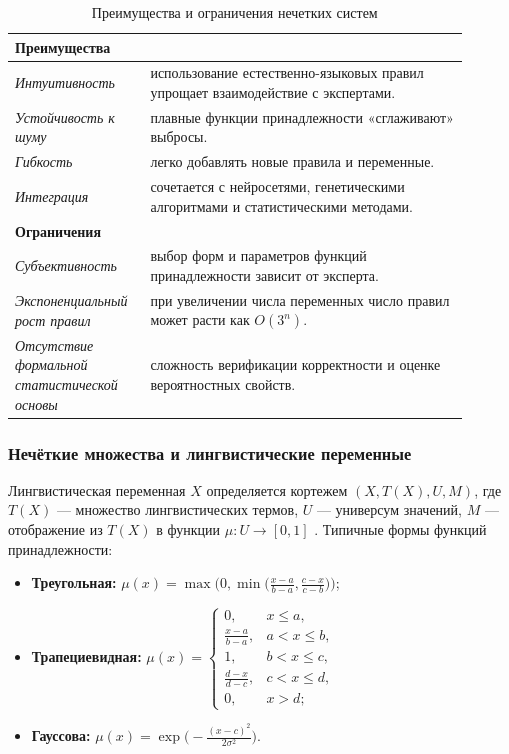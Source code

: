 \begin{table}[H]
\centering\small
\caption{Преимущества и ограничения нечетких систем}
\begin{tabular}{p{0.25\linewidth} p{0.65\linewidth}}
\toprule
\multicolumn{2}{l}{\textbf{Преимущества}} \\
\midrule
\textit{Интуитивность} & использование естественно-языковых правил упрощает взаимодействие с экспертами.\\
\textit{Устойчивость к шуму} & плавные функции принадлежности «сглаживают» выбросы.\\
\textit{Гибкость} & легко добавлять новые правила и переменные.\\
\textit{Интеграция} & сочетается с нейросетями, генетическими алгоритмами и статистическими методами.\\
\midrule
\multicolumn{2}{l}{\textbf{Ограничения}} \\
\midrule
\textit{Субъективность} & выбор форм и параметров функций принадлежности зависит от эксперта.\\
\textit{Экспоненциальный рост правил} & при увеличении числа переменных число правил может расти как \(O(3^n)\).\\
\textit{Отсутствие формальной статистической основы} & сложность верификации корректности и оценке вероятностных свойств.\\
\bottomrule
\end{tabular}
\end{table}


\subsubsection{Нечёткие множества и лингвистические переменные}
Лингвистическая переменная \(X\) определяется кортежем \((X, T(X), U, M)\), где \(T(X)\) --- множество лингвистических термов, \(U\) --- универсум значений, \(M\) --- отображение из \(T(X)\) в функции \(\mu:U\to[0,1]\) \cite{Zadeh1975}. Типичные формы функций принадлежности:
\begin{itemize}[itemsep=1em]
  \item \textbf{Треугольная:} 
    \(\mu(x) = \max\bigl(0, \min\bigl(\tfrac{x-a}{b-a}, \tfrac{c-x}{c-b}\bigr)\bigr)\);
  \item \textbf{Трапециевидная:}
    \(\mu(x) = \begin{cases}
      0, & x \le a,\\
      \tfrac{x-a}{b-a}, & a < x \le b,\\
      1, & b < x \le c,\\
      \tfrac{d-x}{d-c}, & c < x \le d,\\
      0, & x > d;
    \end{cases}\)
  \item \textbf{Гауссова:}
    \(\mu(x) = \exp\bigl(-\tfrac{(x-c)^2}{2\sigma^2}\bigr)\).
\end{itemize}


